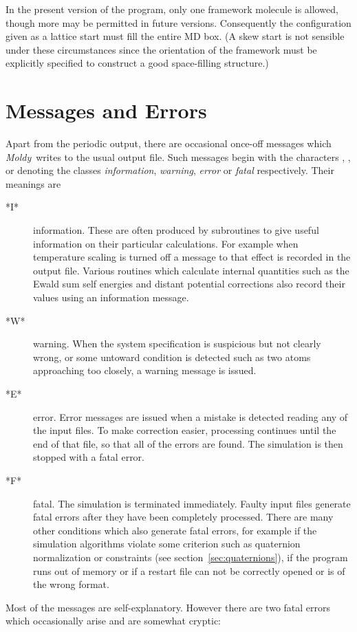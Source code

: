 \documentclass[a4paper,twoside]{report}
\newenvironment{Litdescription}{\begingroup%
     \renewcommand{\descriptionlabel}[1]{\Lit{##1}}\begin{description}}%
     {\end{description}\endgroup}
\newcommand{\moldy}{\emph{Moldy}}
\begin{document}
In the present version of the program, only one framework molecule is
allowed, though more may be permitted in future versions. Consequently
the configuration given as a lattice start must fill the entire MD
box. (A skew start is not sensible under these circumstances since the
orientation of the framework must be explicitly specified to construct
a good space-filling structure.)

\section{Messages and Errors}%

Apart from the periodic output, there are occasional once-off
messages which \moldy\ writes to the usual output file.  Such messages
begin with the characters , ,  or
 denoting the classes \emph{information}, \emph{warning},
\emph{error} or \emph{fatal} respectively.  Their meanings are
\begin{Litdescription}
\item[*I*] information. These are often produced by subroutines
to give useful information on their particular calculations.  For
example when temperature scaling is turned off a message to that
effect is recorded in the output file.  Various routines which
calculate internal quantities such as the Ewald sum self energies and
distant potential corrections also record their values using an
information message.
\item[*W*] warning.  When the system specification is suspicious
but not clearly wrong, or some untoward condition is detected such as
two atoms approaching too closely, a warning message is issued.
\item[*E*] error. Error messages are issued when a mistake is
detected reading any of the input files. To make correction easier,
processing continues until the end of that file, so that all of the
errors are found.  The simulation is then stopped with a fatal error.
\item[*F*] fatal. The simulation is terminated immediately. Faulty 
input files generate fatal errors after they have been completely
processed.  There are many other conditions which also generate fatal
errors, for example if the simulation algorithms violate some
criterion such as quaternion normalization or constraints (see
section~\ref{sec:quaternions}), if the program runs out of memory or
if a restart file can not be correctly opened or is of the wrong
format.
\end{Litdescription}
Most of the messages are self-explanatory.  However there are two
fatal errors which occasionally arise and are somewhat cryptic:
\end{document}
